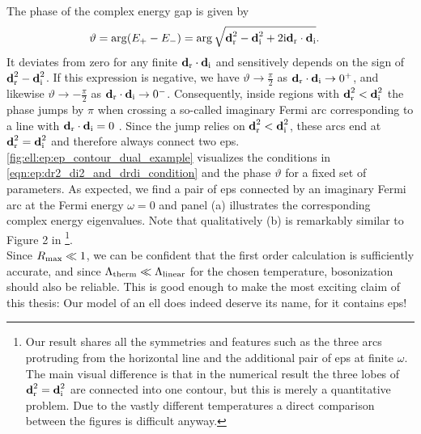 The phase of the complex energy gap is given by
\begin{align}
\vartheta &= \arg \kla*{E_+ - E_-} = \arg \sqrt{\textbf{d}_\r^2 - \textbf{d}_\i^2 + 2\i \textbf{d}_\r\cdot \textbf{d}_\i}. \label{eqn:ell:ep:phase_vartheta}
\end{align}
It deviates from zero for any finite $\textbf{d}_{\text{r}}\cdot\textbf{d}_{\text{i}}$ and sensitively depends on the sign of $\textbf{d}_{\text{r}}^2 - \textbf{d}_{\text{i}}^2$.
If this expression is negative, we have $\vartheta\rightarrow \frac{\pi}{2}$ as $\textbf{d}_{\text{r}}\cdot\textbf{d}_{\text{i}}\rightarrow 0^+$, and likewise $\vartheta\rightarrow - \frac{\pi}{2}$ as $\textbf{d}_{\text{r}}\cdot\textbf{d}_{\text{i}}\rightarrow 0^-$.
Consequently, inside regions with $\textbf{d}_{\text{r}}^2<\textbf{d}_{\text{i}}^2$ the phase jumps by $\pi$ when crossing a so-called imaginary Fermi arc corresponding to a line with $\textbf{d}_{\text{r}}\cdot\textbf{d}_{\text{i}}=0$ \cite[\ssec II.B]{ExceptTop_RevModPhys.93.015005}.
Since the jump relies on $\textbf{d}_{\text{r}}^2<\textbf{d}_{\text{i}}^2$, these arcs end at $\textbf{d}_{\text{r}}^2=\textbf{d}_{\text{i}}^2$ and therefore always connect two \glspl{ep}.
\autoref{fig:ell:ep:ep_contour_dual_example} visualizes the conditions in \autoref{eqn:ep:dr2_di2_and_drdi_condition} and the phase $\vartheta$ for a fixed set of parameters.
As expected, we find a pair of \glspl{ep} connected by an imaginary Fermi arc at the Fermi energy $\omega=0$ and panel (a) illustrates the corresponding complex energy eigenvalues.
Note that qualitatively (b) is remarkably similar to Figure 2 in \cite{EP_DynamicInduced_Quenched_Lehmann_2021}\footnote{Our result shares all the symmetries and features such as the three arcs protruding from the horizontal line and the additional pair of \glspl{ep} at finite $\omega$.
The main visual difference is that in the numerical result the three lobes of $\textbf{d}_{\text{r}}^2 = \textbf{d}_{\text{i}}^2$ are connected into one contour, but this is merely a quantitative problem.
Due to the vastly different temperatures a direct comparison between the figures is difficult anyway.}.\\
Since $R_\text{max}\ll 1$, we can be confident that the first order calculation is sufficiently accurate, and since $\Lambda_{\text{therm}} \ll \Lambda_{\text{linear}}$ for the chosen temperature, bosonization should also be reliable.
This is good enough to make the most exciting claim of this thesis: Our model of an \gls{ell} does indeed deserve its name, for it contains \glspl{ep}!

